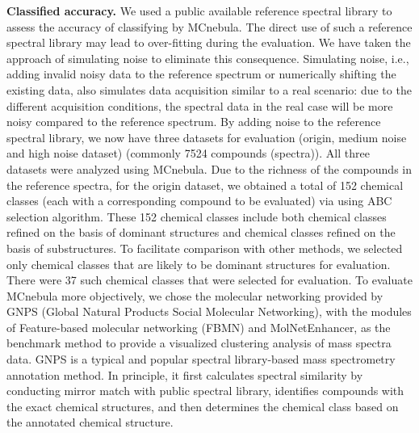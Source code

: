 \documentclass[
]{article}
\begin{document}
\textbf{Classified accuracy.} We used a public available reference
spectral library to assess the accuracy of classifying by MCnebula. The
direct use of such a reference spectral library may lead to over-fitting
during the evaluation. We have taken the approach of simulating noise to
eliminate this consequence. Simulating noise, i.e., adding invalid noisy
data to the reference spectrum or numerically shifting the existing
data, also simulates data acquisition similar to a real scenario: due to
the different acquisition conditions, the spectral data in the real case
will be more noisy compared to the reference spectrum. By adding noise
to the reference spectral library, we now have three datasets for
evaluation (origin, medium noise and high noise dataset) (commonly 7524
compounds (spectra)). All three datasets were analyzed using MCnebula.
Due to the richness of the compounds in the reference spectra, for the
origin dataset, we obtained a total of 152 chemical classes (each with a
corresponding compound to be evaluated) via using ABC selection
algorithm. These 152 chemical classes include both chemical classes
refined on the basis of dominant structures and chemical classes refined
on the basis of substructures. To facilitate comparison with other
methods, we selected only chemical classes that are likely to be
dominant structures for evaluation. There were 37 such chemical classes
that were selected for evaluation. To evaluate MCnebula more
objectively, we chose the molecular networking provided by GNPS (Global
Natural Products Social Molecular Networking), with the modules of
Feature-based molecular networking (FBMN) and MolNetEnhancer, as the
benchmark method to provide a visualized clustering analysis of mass
spectra data. GNPS is a typical and popular spectral library-based mass
spectrometry annotation method. In principle, it first calculates
spectral similarity by conducting mirror match with public spectral
library, identifies compounds with the exact chemical structures, and
then determines the chemical class based on the annotated chemical
structure.
\end{document}
